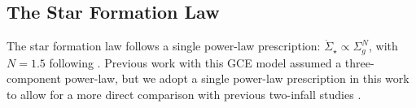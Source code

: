 \documentclass[twocolumn,twocolappendix,linenumbers]{aastex631}
\newcommand{\todo}[1]{{\color{red}#1}}
\begin{document}


\subsection{The Star Formation Law}
\label{sec:sf-law}

The star formation law follows a single power-law prescription: $\dot\Sigma_\star\propto\Sigma_g^N$, with $N=1.5$ following \citet{kennicutt_global_1998}. Previous work with this GCE model \citep[e.g.,][]{johnson_stellar_2021,dubay_galactic_2024} assumed a three-component power-law, but we adopt a single power-law prescription in this work to allow for a more direct comparison with previous two-infall studies \citep[e.g.,][]{spitoni_remind_2024}. 
\end{document}
